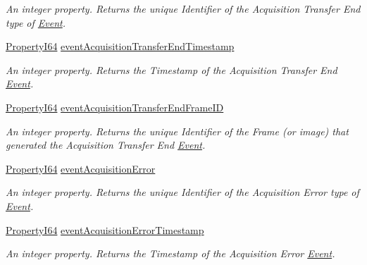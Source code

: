 \begin{DoxyCompactItemize}
\begin{DoxyCompactList}\small\item\em An integer property. Returns the unique Identifier of the Acquisition Transfer End type of \hyperlink{classmv_i_m_p_a_c_t_1_1acquire_1_1_event}{Event}. \end{DoxyCompactList}\item 
\hyperlink{group___common_interface_ga81749b2696755513663492664a18a893}{Property\+I64} \hyperlink{classmv_i_m_p_a_c_t_1_1acquire_1_1_gen_i_cam_1_1_event_control_ac4bfe3db67cea2a631b32627150d357a}{event\+Acquisition\+Transfer\+End\+Timestamp}
\begin{DoxyCompactList}\small\item\em An integer property. Returns the Timestamp of the Acquisition Transfer End \hyperlink{classmv_i_m_p_a_c_t_1_1acquire_1_1_event}{Event}. \end{DoxyCompactList}\item 
\hyperlink{group___common_interface_ga81749b2696755513663492664a18a893}{Property\+I64} \hyperlink{classmv_i_m_p_a_c_t_1_1acquire_1_1_gen_i_cam_1_1_event_control_af3d8677549c711684e9787f684d20070}{event\+Acquisition\+Transfer\+End\+Frame\+I\+D}
\begin{DoxyCompactList}\small\item\em An integer property. Returns the unique Identifier of the Frame (or image) that generated the Acquisition Transfer End \hyperlink{classmv_i_m_p_a_c_t_1_1acquire_1_1_event}{Event}. \end{DoxyCompactList}\item 
\hyperlink{group___common_interface_ga81749b2696755513663492664a18a893}{Property\+I64} \hyperlink{classmv_i_m_p_a_c_t_1_1acquire_1_1_gen_i_cam_1_1_event_control_aa84bdaf972d20094abb797823e639cf2}{event\+Acquisition\+Error}
\begin{DoxyCompactList}\small\item\em An integer property. Returns the unique Identifier of the Acquisition Error type of \hyperlink{classmv_i_m_p_a_c_t_1_1acquire_1_1_event}{Event}. \end{DoxyCompactList}\item 
\hyperlink{group___common_interface_ga81749b2696755513663492664a18a893}{Property\+I64} \hyperlink{classmv_i_m_p_a_c_t_1_1acquire_1_1_gen_i_cam_1_1_event_control_a5a344028e412bb078fa54c2d7d23ead6}{event\+Acquisition\+Error\+Timestamp}
\begin{DoxyCompactList}\small\item\em An integer property. Returns the Timestamp of the Acquisition Error \hyperlink{classmv_i_m_p_a_c_t_1_1acquire_1_1_event}{Event}. \end{DoxyCompactList}\item 

\end{DoxyCompactItemize}
